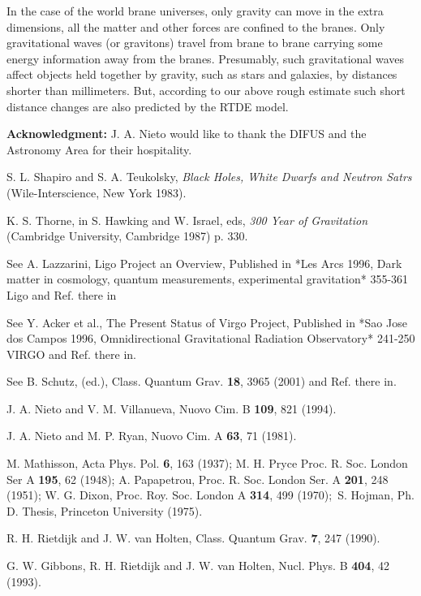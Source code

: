 \documentclass[a4paper,12pt]{article}
\begin{document}
In the case of the world brane universes, only gravity can move in the extra
dimensions, all the matter and other forces are confined to the branes. Only
gravitational waves (or gravitons) travel from brane to brane carrying some
energy information away from the branes. Presumably, such gravitational
waves affect objects held together by gravity, such as stars and galaxies,
by distances shorter than millimeters. But, according to our above rough
estimate such short distance changes are also predicted by the RTDE model.

\bigskip

\textbf{Acknowledgment: }J. A. Nieto would like to thank the DIFUS and the
Astronomy Area for their hospitality.

\begin{thebibliography}{99}
  S. L. Shapiro and S. A. Teukolsky, \textit{Black Holes, White
Dwarfs and Neutron Satrs} (Wile-Interscience, New York 1983).

  K. S. Thorne, in S. Hawking and W. Israel, eds, \textit{300
Year of Gravitation} (Cambridge University, Cambridge 1987) p. 330.

  See A. Lazzarini, Ligo Project an Overview, Published in *Les
Arcs 1996, Dark matter in cosmology, quantum measurements, experimental
gravitation* 355-361 Ligo and Ref. there in

  See Y. Acker et al., The Present Status of Virgo Project,
Published in *Sao Jose dos Campos 1996, Omnidirectional Gravitational
Radiation Observatory* 241-250 VIRGO and Ref. there in.

  See B. Schutz, (ed.), Class. Quantum Grav. \textbf{18}, 3965
(2001) and Ref. there in.

  J. A. Nieto and V. M. Villanueva, Nuovo Cim. B \textbf{109},
821 (1994).

  J. A. Nieto and M. P. Ryan, Nuovo Cim. A \textbf{63}, 71 (1981).

  M. Mathisson, Acta Phys. Pol. \textbf{6}, 163 (1937); M. H.
Pryce Proc. R. Soc. London Ser A \textbf{195}, 62 (1948); A. Papapetrou,
Proc. R. Soc. London Ser. A \textbf{201}, 248 (1951); W. G. Dixon, Proc.
Roy. Soc. London A \textbf{314}, 499 (1970);\ S. Hojman, Ph. D. Thesis,
Princeton University (1975).

  R. H. Rietdijk and J. W. van Holten, Class. Quantum Grav. 
\textbf{7}, 247 (1990).

  G. W. Gibbons, R. H. Rietdijk and J. W. van Holten, Nucl.
Phys. B \textbf{404}, 42 (1993).


\end{thebibliography}
\end{document}
